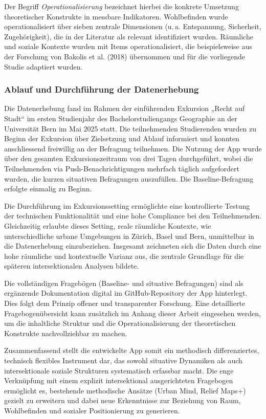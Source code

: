 Der Begriff \emph{Operationalisierung} bezeichnet hierbei die konkrete Umsetzung theoretischer Konstrukte in messbare Indikatoren. Wohlbefinden wurde operationalisiert über sieben zentrale Dimensionen (u.\,a. Entspannung, Sicherheit, Zugehörigkeit), die in der Literatur als relevant identifiziert wurden. Räumliche und soziale Kontexte wurden mit Items operationalisiert, die beispielsweise aus der Forschung von Bakolis et al. (2018) übernommen und für die vorliegende Studie adaptiert wurden.

\subsubsection{Ablauf und Durchführung der Datenerhebung}

Die Datenerhebung fand im Rahmen der einführenden Exkursion „Recht auf Stadt“ im ersten Studienjahr des Bachelorstudiengangs Geographie an der Universität Bern im Mai 2025 statt. Die teilnehmenden Studierenden wurden zu Beginn der Exkursion über Zielsetzung und Ablauf informiert und konnten anschliessend freiwillig an der Befragung teilnehmen. Die Nutzung der App wurde über den gesamten Exkursionszeitraum von drei Tagen durchgeführt, wobei die Teilnehmenden via Push-Benachrichtigungen mehrfach täglich aufgefordert wurden, die kurzen situativen Befragungen auszufüllen. Die Baseline-Befragung erfolgte einmalig zu Beginn.

Die Durchführung im Exkursionssetting ermöglichte eine kontrollierte Testung der technischen Funktionalität und eine hohe Compliance bei den Teilnehmenden. Gleichzeitig erlaubte dieses Setting, reale räumliche Kontexte, wie unterschiedliche urbane Umgebungen in Zürich, Basel und Bern, unmittelbar in die Datenerhebung einzubeziehen. Insgesamt zeichneten sich die Daten durch eine hohe räumliche und kontextuelle Varianz aus, die zentrale Grundlage für die späteren intersektionalen Analysen bildete.

Die vollständigen Fragebögen (Baseline- und situative Befragungen) sind als ergänzende Dokumentation digital im GitHub-Repository der App hinterlegt. Dies folgt dem Prinzip offener und transparenter Forschung. Eine detaillierte Fragebogenübersicht kann zusätzlich im Anhang dieser Arbeit eingesehen werden, um die inhaltliche Struktur und die Operationalisierung der theoretischen Konstrukte nachvollziehbar zu machen.

Zusammenfassend stellt die entwickelte App somit ein methodisch differenziertes, technisch flexibles Instrument dar, das sowohl situative Dynamiken als auch intersektionale soziale Strukturen systematisch erfassbar macht. Die enge Verknüpfung mit einem explizit intersektional ausgerichteten Fragebogen ermöglicht es, bestehende methodische Ansätze (Urban Mind, Relief Maps+) gezielt zu erweitern und dabei neue Erkenntnisse zur Beziehung von Raum, Wohlbefinden und sozialer Positionierung zu generieren.


